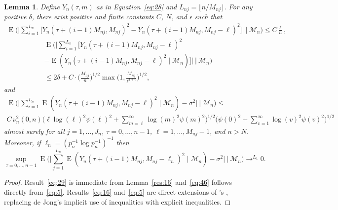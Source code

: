 \documentclass[11pt]{article}
\newcommand\citepos[2][]{\citeauthor{#2}'s \citeyearpar[#1]{#2}}
\newtheorem{lem}{Lemma}
\theoremstyle{definition}
\DeclareMathOperator{\E}{E}
\begin{document}
\begin{lem}\label{res:7}
  Define $Y_n(\tau, m)$ as in Equation~\eqref{eq:28} and $L_{nj} =
  \lfloor n/M_{nj}\rfloor$. For any positive $\delta$, there exist
  positive and finite constants $C$, $N$, and $\epsilon$ such that
\begin{multline}\label{eq:29}
  \E\Big(\Big\lvert\sum_{i=1}^{L_n} \big[Y_{n}(\tau + (i-1) M_{nj},
  M_{nj})^2 -  Y_{n}(\tau + (i-1) M_{nj}, M_{nj} -
  \ell)^2\big]\Big\rvert \ \Big|\
  \mathcal{M}_n\Big) \leq C \tfrac{\ell}{n},
\end{multline}
\begin{multline}\label{eq:16}
  \E\Big(\Big\lvert\sum_{i=1}^{L_n} \big[Y_{n}(\tau + (i-1) M_{nj},
  M_{nj} - \ell)^2 \\- \E(Y_{n}(\tau + (i-1) M_{nj}, M_{nj} -
  \ell)^2 \mid \mathcal{M}_n)\big]\Big\rvert \ \Big|\
  \mathcal{M}_n\Big)\\ \leq 2 \delta + C \cdot \big(\tfrac{M_{nj}}{n}\big)^{1/2}
  \max\big(1, \tfrac{M_{nj}}{\ell^{1+\epsilon}}\big)^{1/2},
\end{multline}
and
  \begin{multline}
    \label{eq:5}
    \E\Big(\Big\lvert \sum_{i=1}^{L_{n}} \E(Y_n(\tau + (i-1) M_{nj}, M_{nj} - \ell)^2 \mid
    \mathcal{M}_n) - \sigma^2 \Big\rvert \ \Big|\ \mathcal{M}_n\Big) \leq 
    \\ C\,  \nu_n^2(0, n) \Big(\ell \log(\ell)^2 \psi(\ell)^2 
     + \sum_{m=\ell}^{\infty} \log(m)^2 \psi(m)^2 \Big)^{1/2} \Big( \psi(0)^2 + \sum_{v=1}^{\infty} \log(v)^2 \psi(v)^2 \Big)^{1/2}
  \end{multline}
  almost surely for all $j = 1,\dots,J_n$, $\tau= 0,\dots,n-1$,
  $\ell=1,\dots,M_{nj}-1$, and $n > N$.  Moreover, if $\ell_n =
  (p_n^{-1} \log p_n^{-1})^{-1}$ then
  \begin{equation}
    \label{eq:46}
    \sup_{\tau=0,\dots,n-1} \E\Big(\Big\lvert \sum_{j=1}^{L_{n}} \E(Y_n(\tau + (i-1) M_{nj}, M_{nj} - \ell_n)^2 \mid
    \mathcal{M}_n) - \sigma^2 \Big\rvert \ \Big|\ \mathcal{M}_n\Big) \to^{L_1} 0.
  \end{equation}
\end{lem}
\begin{proof}
  Result~\eqref{eq:29} is immediate from Lemma~\ref{res:16}
  and~\eqref{eq:46} follows directly from~\eqref{eq:5}.
  Results~\eqref{eq:16} and~\eqref{eq:5} are direct extensions of
  \citepos[Lemmas 5 and 4, respectively]{Jon:97}, replacing de Jong's
  implicit use of inequalities with explicit inequalities.
\end{proof}

\end{document}
